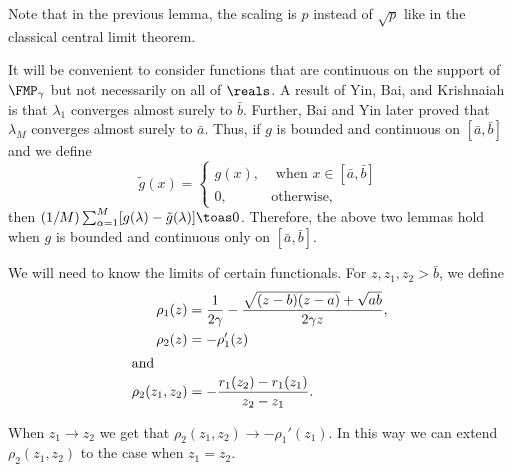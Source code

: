 Note that in the previous lemma, the scaling is $p$ instead of $\sqrt{p}$ like in the classical central limit theorem.

It will be convenient to consider functions that are continuous on the support
of $\FMP_\gamma$ but not necessarily on all of $\reals$.  A result of Yin, Bai, and
Krishnaiah \cite{yin1988lle} is that $\lambda_1$ converges almost surely to
$\bar b$.  Further, Bai and Yin \cite{bai1993lse} later proved that
$\lambda_M$ converges almost surely to $\bar a$.  Thus, if $g$ is 
bounded and continuous on $[\bar a, \bar b]$ and we define 
\[
    \tilde g (x)
    =
    \begin{cases}
        g(x), &\text{ when $x \in [\bar a, \bar b]$} \\
        0,    &\text{otherwise,}
    \end{cases}
\]
then $(1/M) \sum_{\alpha=1}^M [ g(\lambda) - \tilde g (\lambda)] \toas 0$.  
Therefore, the above two lemmas hold when $g$ is bounded and continuous only
on $[\bar a, \bar b]$.

We will need to know the limits of certain functionals.  For
$z, z_1, z_2 > \bar b$, we define
\begin{align*}
    \rho_1(z)
        &=
        \frac{1}{2 \gamma}
        -
        \frac{\sqrt{(z - b)(z - a)} + \sqrt{ a b}}
             {2 \gamma z}, \\
    \rho_2(z)
        &= -\rho_{1}'(z) \\
\intertext{and}
    \rho_2(z_1, z_2)
        &= - \frac{r_1(z_2) - r_1(z_1)}{z_2 - z_1}.
\end{align*}

\noindent
When $z_1 \to z_2$ we get that $\rho_2 (z_1, z_2) \to - \rho_1'(z_1)$.  In this way we can extend $\rho_2 (z_1, z_2)$ to the case when $z_1 = z_2$.

